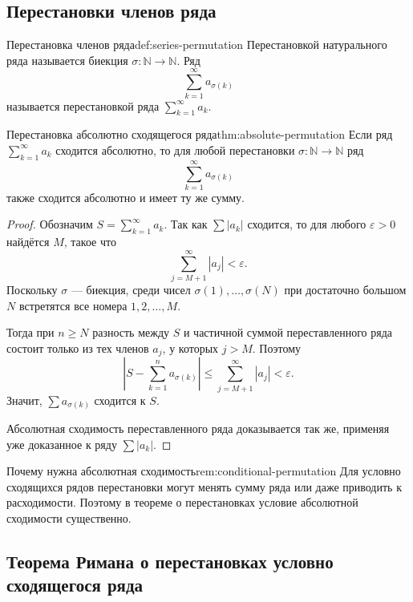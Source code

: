 \subsection{Перестановки членов ряда}

\begin{Definition}{Перестановка членов ряда}{def:series-permutation}
	Перестановкой натурального ряда называется биекция \(\sigma:\mathbb N\to\mathbb N\). Ряд
	\[
	\sum_{k=1}^{\infty} a_{\sigma(k)}
	\]
	называется перестановкой ряда \(\sum_{k=1}^{\infty}a_k\).
\end{Definition}

\begin{Theorem}{Перестановка абсолютно сходящегося ряда}{thm:absolute-permutation}
	Если ряд \(\sum_{k=1}^{\infty}a_k\) сходится абсолютно, то для любой перестановки \(\sigma:\mathbb N\to\mathbb N\) ряд
	\[
	\sum_{k=1}^{\infty}a_{\sigma(k)}
	\]
	также сходится абсолютно и имеет ту же сумму.
\end{Theorem}

\begin{proof}
Обозначим \(S=\sum_{k=1}^{\infty}a_k\). Так как \(\sum |a_k|\) сходится, то для любого \(\varepsilon>0\) найдётся \(M\), такое что
\[
\sum_{j=M+1}^{\infty}|a_j|<\varepsilon.
\]
Поскольку \(\sigma\) — биекция, среди чисел \(\sigma(1),\dots,\sigma(N)\) при достаточно большом \(N\) встретятся все номера \(1,2,\dots,M\).

Тогда при \(n\ge N\) разность между \(S\) и частичной суммой переставленного ряда состоит только из тех членов \(a_j\), у которых \(j>M\). Поэтому
\[
\left|
S-\sum_{k=1}^{n}a_{\sigma(k)}
\right|
\le
\sum_{j=M+1}^{\infty}|a_j|
<\varepsilon.
\]
Значит, \(\sum a_{\sigma(k)}\) сходится к \(S\).

Абсолютная сходимость переставленного ряда доказывается так же, применяя уже доказанное к ряду \(\sum |a_k|\). 
\end{proof}

\begin{Remark}{Почему нужна абсолютная сходимость}{rem:conditional-permutation}
	Для условно сходящихся рядов перестановки могут менять сумму ряда или даже приводить к расходимости. Поэтому в теореме о перестановках условие абсолютной сходимости существенно.
\end{Remark}

\subsection{Теорема Римана о перестановках условно сходящегося ряда}


